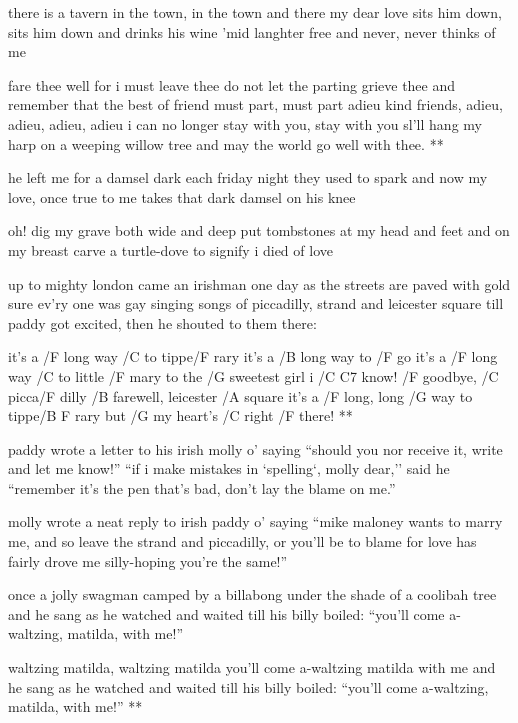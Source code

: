 
there is a tavern in the town, in the town
and there my dear love sits him down, sits him down
and drinks his wine 'mid langhter free
and never, never thinks of me

\R  fare thee well for i must leave thee
    do not let the parting grieve thee
    and remember that the best of friend must part, must part
    adieu kind friends, adieu, adieu, adieu, adieu
    i can no longer stay with you, stay with you
    sl'll hang my harp on a weeping willow tree
    and may the world go well with thee. **

he left me for a damsel dark
each friday night they used to spark
and now my love, once true to me
takes that dark damsel on his knee \s

oh! dig my grave both wide and deep
put tombstones at my head and feet
and on my breast carve a turtle-dove
to signify i died of love




up to mighty london came an irishman one day
as the streets are paved with gold sure ev'ry one was gay
singing songs of piccadilly, strand and leicester square
till paddy got excited, then he shouted to them there:

\R  it's a /F long way /C to tippe/F rary
    it's a /B long way to /F go
    it's a /F long way /C to little /F mary
    to the /G sweetest girl i /{C C7} know!
    /F goodbye, /C picca/F dilly
    /B farewell, leicester /A square
    it's a /F long, long /G way to tippe/{B F} rary
    but /G my heart's /C right /F there! **

paddy wrote a letter to his irish molly o'
saying ``should you nor receive it, write and let me know!''
``if i make mistakes in `spelling`, molly dear,'' said he
``remember it's the pen that's bad, don't lay the blame on me.'' \s

molly wrote a neat reply to irish paddy o'
saying ``mike maloney wants to marry me, and so
leave the strand and piccadilly, or you'll be to blame
for love has fairly drove me silly-hoping you're the same!''




once a jolly swagman camped by a billabong
under the shade of a coolibah tree
and he sang as he watched and waited till his billy boiled:
``you'll come a-waltzing, matilda, with me!''

\R  waltzing matilda, waltzing matilda
    you'll come a-waltzing matilda with me
    and he sang as he watched and waited till his billy boiled:
    ``you'll come a-waltzing, matilda, with me!'' **

